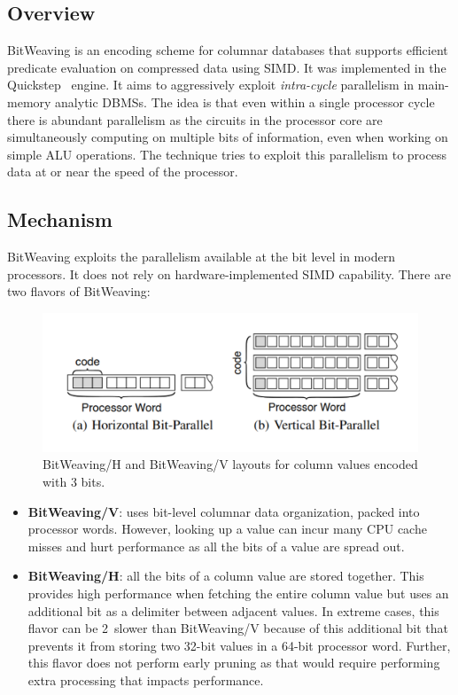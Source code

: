 \documentclass[11pt]{article}
\begin{document}
\subsection{Overview}
BitWeaving is an encoding scheme for columnar databases that supports efficient predicate evaluation on compressed data using SIMD\@. It was implemented in the Quickstep~\cite{quickstep} engine. It aims to aggressively exploit \textit{intra-cycle} parallelism in main-memory analytic DBMSs. The idea is that even within a single processor cycle there is abundant parallelism as the circuits in the processor core are simultaneously computing on multiple bits of information, even when working on simple ALU operations. The technique tries to exploit this parallelism to process data at or near the speed of the processor.


\subsection{Mechanism}
BitWeaving exploits the parallelism available at the bit level in modern processors. It does not rely on hardware-implemented SIMD capability. There are two flavors of BitWeaving:
\begin{figure}[H]
    \centering
    \includegraphics[width=0.5\linewidth]{fig/bitweaving-flavors.pdf}
    \caption{BitWeaving/H and BitWeaving/V layouts for column values encoded with 3 bits.}\label{fig:bitweaving-flavors}
\end{figure}
\begin{itemize}
    \item \textbf{BitWeaving/V}: uses bit-level columnar data organization, packed into processor words. However, looking up a value can incur many CPU cache misses and hurt performance as all the bits of a value are spread out.
    \item \textbf{BitWeaving/H}: all the bits of a column value are stored together. This provides high performance when fetching the entire column value but uses an additional bit as a delimiter between adjacent values. In extreme cases, this flavor can be 2\texttimes\ slower than BitWeaving/V because of this additional bit that prevents it from storing two 32-bit values in a 64-bit processor word. Further, this flavor does not perform early pruning as that would require performing extra processing that impacts performance.
\end{itemize}
\end{document}
